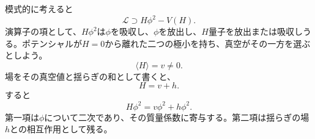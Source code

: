模式的に考えると
\begin{equation}
\mathcal L\supset H\phi^2-V(H).
\end{equation}
演算子の項として、\(H\phi^2\)は\(\phi\)を吸収し、\(\phi\)を放出し、\(H\)量子を放出または吸収しうる。ポテンシャルが\(H=0\)から離れた二つの極小を持ち、真空がその一方を選ぶとしよう。
\begin{equation}
\langle H\rangle=v\ne0.
\end{equation}
場をその真空値と揺らぎの和として書くと、
\begin{equation}
H=v+h.
\end{equation}
すると
\begin{equation}
H\phi^2=v\phi^2+h\phi^2.
\end{equation}
第一項は\(\phi\)について二次であり、その質量係数に寄与する。第二項は揺らぎの場\(h\)との相互作用として残る。

\begin{classroomqa}
\end{classroomqa}
